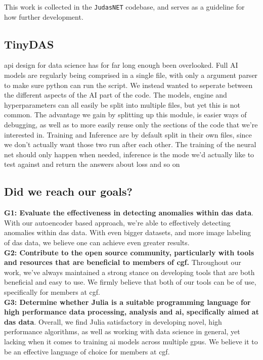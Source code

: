 This work is collected in the \texttt{JudasNET} codebase, and serves as a guideline for how further development.


\subsection{TinyDAS}

api design for data science has for far long enough been overlooked. Full AI models are regularly being comprised in a single file, with only a argument parser to make sure python can run the script. We instead wanted to seperate between the different aspects of the AI part of the code. The models, engine and hyperparameters can all easily be split into multiple files, but yet this is not common. The advantage we gain by splitting up this module, is easier ways of debugging, as well as to more easily reuse only the sections of the code that we're interested in. Training and Inference are by default split in their own files, since we don't actually want those two run after each other. The training of the neural net should only happen when needed, inference is the mode we'd actually like to test against and return the answers about loss and so on 


\subsection{Did we reach our goals?}


\textbf{G1: Evaluate the effectiveness in detecting anomalies within \acrshort{das} data}. With our autoencoder based approach, we're able to effectively detecting anomalies within \acrshort{das} data. With even bigger datasets, and more image labeling of \acrshort{das} data, we believe one can achieve even greater results. \\

\textbf{G2: Contribute to the open source community, particularly with tools and resources that are beneficial to members of \acrshort{cgf}.} Throughout our work, we've always maintained a strong stance on developing tools that are both beneficial and easy to use. We firmly believe that both of our tools can be of use, specifically for members at \acrshort{cgf}.  \\ 

\textbf{G3: Determine whether Julia is a suitable programming language for 
 high performance data processing, analysis and \acrshort{ai}, specifically aimed at \acrshort{das} data}. Overall, we find Julia satisfactory in developing novel, high performance algorithms, as well as working with data science in general, yet lacking when it comes to training \acrshort{ai} models across multiple \acrshort{gpu}s. We believe it to be an effective language of choice for members at \acrshort{cgf}.\\


